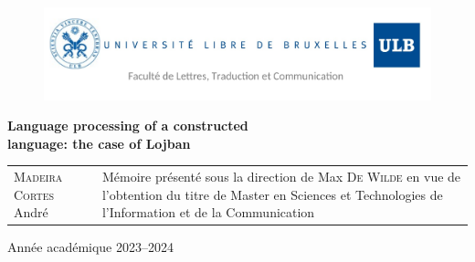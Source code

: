 

\usepackage[
    backend=bibtex, style=authortitle, defernumbers=true, backref=true, block=none, hyperref=true
]{biblatex}



\setlength{}



\begin{titlingpage}

\begin{figure}[H]
\vspace{-2cm}
\hspace{-2.5cm}
\includegraphics[scale=0.30]{images/header.png}
\end{figure}

\vfill

\begin{center}
\hspace{-0.5cm}
\Huge{\textbf{Language processing of a constructed \\language: the case of Lojban}}\\
\end{center}

\vfill

\begin{tabular}{b{6.5cm}b{7.5cm}}
\textsc{Madeira Cortes} André & Mémoire présenté sous la direction de Max \textsc{De Wilde}
en vue de l'obtention du titre de Master en Sciences et Technologies de l'Information et de la Communication\\
\end{tabular}

\vfill

\begin{center}
\Large Année académique 2023--2024
\end{center}

\end{titlingpage}

\pagestyle{empty}
\newpage \ \newpage %

